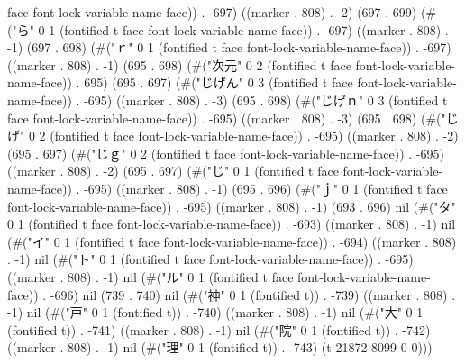 face font-lock-variable-name-face)) . -697) ((marker . 808) . -2) (697 . 699) (#("ら" 0 1 (fontified t face font-lock-variable-name-face)) . -697) ((marker . 808) . -1) (697 . 698) (#("ｒ" 0 1 (fontified t face font-lock-variable-name-face)) . -697) ((marker . 808) . -1) (695 . 698) (#("次元" 0 2 (fontified t face font-lock-variable-name-face)) . 695) (695 . 697) (#("じげん" 0 3 (fontified t face font-lock-variable-name-face)) . -695) ((marker . 808) . -3) (695 . 698) (#("じげｎ" 0 3 (fontified t face font-lock-variable-name-face)) . -695) ((marker . 808) . -3) (695 . 698) (#("じげ" 0 2 (fontified t face font-lock-variable-name-face)) . -695) ((marker . 808) . -2) (695 . 697) (#("じｇ" 0 2 (fontified t face font-lock-variable-name-face)) . -695) ((marker . 808) . -2) (695 . 697) (#("じ" 0 1 (fontified t face font-lock-variable-name-face)) . -695) ((marker . 808) . -1) (695 . 696) (#("ｊ" 0 1 (fontified t face font-lock-variable-name-face)) . -695) ((marker . 808) . -1) (693 . 696) nil (#("タ" 0 1 (fontified t face font-lock-variable-name-face)) . -693) ((marker . 808) . -1) nil (#("イ" 0 1 (fontified t face font-lock-variable-name-face)) . -694) ((marker . 808) . -1) nil (#("ト" 0 1 (fontified t face font-lock-variable-name-face)) . -695) ((marker . 808) . -1) nil (#("ル" 0 1 (fontified t face font-lock-variable-name-face)) . -696) nil (739 . 740) nil (#("神" 0 1 (fontified t)) . -739) ((marker . 808) . -1) nil (#("戸" 0 1 (fontified t)) . -740) ((marker . 808) . -1) nil (#("大" 0 1 (fontified t)) . -741) ((marker . 808) . -1) nil (#("院" 0 1 (fontified t)) . -742) ((marker . 808) . -1) nil (#("理" 0 1 (fontified t)) . -743) (t 21872 8099 0 0)))
